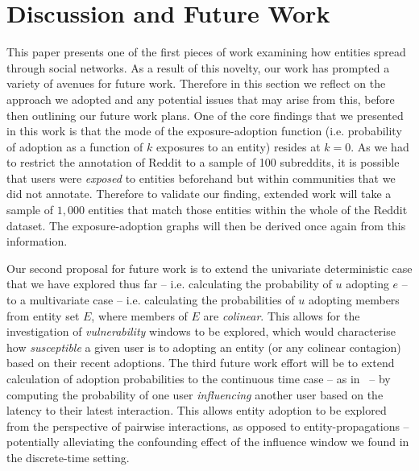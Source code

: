 \documentclass[sigconf]{acmart}
\begin{document}
\section{Discussion and Future Work}
\label{sec:discussions}
This paper presents one of the first pieces of work examining how entities spread through social networks.
As a result of this novelty, our work has prompted a variety of avenues for future work.
Therefore in this section we reflect on the approach we adopted and any potential issues that may arise from this, before then outlining our future work plans.
One of the core findings that we presented in this work is that the mode of the exposure-adoption function (i.e. probability of adoption as a function of $k$ exposures to an entity) resides at $k=0$.
As we had to restrict the annotation of Reddit to a sample of 100 subreddits, it is possible that users were \emph{exposed} to entities beforehand but within communities that we did not annotate.
Therefore to validate our finding, extended work will take a sample of $1,000$ entities that match those entities within the whole of the Reddit dataset.
The exposure-adoption graphs will then be derived once again from this information.

Our second proposal for future work is to extend the univariate deterministic case that we have explored thus far -- i.e. calculating the probability of $u$ adopting $e$ -- to a multivariate case -- i.e. calculating the probabilities of $u$ adopting members from entity set $E$, where members of $E$ are \emph{colinear}.
This allows for the investigation of \emph{vulnerability} windows to be explored, which would characterise how \emph{susceptible} a given user is to adopting an entity (or any colinear contagion) based on their recent adoptions.
The third future work effort will be to extend  calculation of adoption probabilities to the continuous time case -- as in~\cite{huang2014temporal} -- by computing the probability of one user \emph{influencing} another user based on the latency to their latest interaction.
This allows entity adoption to be explored from the perspective of pairwise interactions, as opposed to entity-propagations -- potentially alleviating the confounding effect of the influence window we found in the discrete-time setting.
\end{document}
